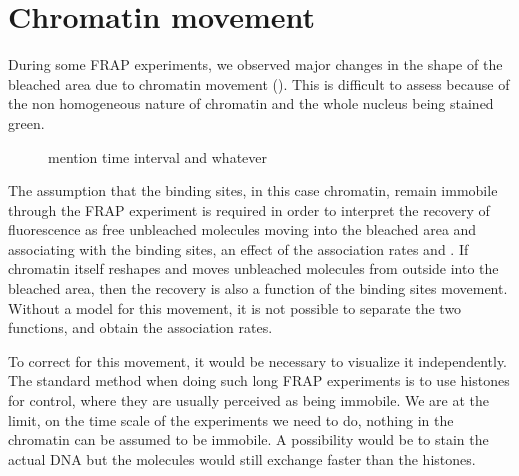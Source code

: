   


\section{Chromatin movement}
  
  During some FRAP experiments, we observed major changes in the shape of the bleached area due to
  chromatin movement (). This is difficult to assess because of the
  non homogeneous nature of chromatin and the whole nucleus being stained green.
  
  \begin{figure}
    \centering
                 {mention time interval and whatever}
    \label{fig:frap-chromatin-movement}
  \end{figure}
  
  The assumption that the binding sites, in this case chromatin, remain immobile through the FRAP experiment is
  required in order to interpret the recovery of fluorescence as free unbleached molecules moving
  into the bleached area and associating with the binding sites, an effect of the association rates \Kon and
  \Koff. If chromatin itself reshapes and moves unbleached molecules from outside into the bleached area, then
  the recovery is also a function of the binding sites movement. Without a model for this movement, it is not
  possible to separate the two functions, and obtain the association rates.
  
  To correct for this movement, it would be necessary to visualize it independently. The standard method when doing such long
  FRAP experiments is to use histones for control, where they are usually perceived as being immobile. We are
  at the limit, on the time scale of the experiments we need to do, nothing in the chromatin can be assumed
  to be immobile. A possibility would be to stain the actual DNA but the molecules would still exchange faster
  than the histones.
  
